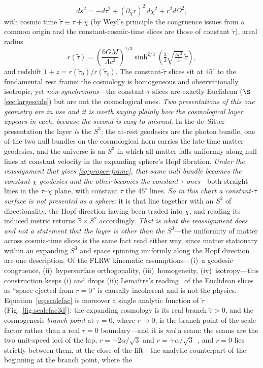 \documentclass[11pt,a4paper]{article}
\theoremstyle{plain}
\theoremstyle{definition}
\theoremstyle{remark}
\begin{document}
\begin{equation}
ds^2=-d\tau^2+(\partial_\chi r)^2\,d\chi^2+r^2 d\Omega^2,
\label{eq:proper-frame}
\end{equation}
with cosmic time $\tilde\tau\equiv\tau+\chi$ (by Weyl's principle the congruence issues from a common origin and the constant-cosmic-time slices are those of constant $\tilde\tau$), areal radius
\begin{equation}
r(\tilde\tau)=\left(\frac{6GM}{\Lambda c^2}\right)^{1/3}\sinh^{2/3}\!\left(\tfrac32\sqrt{\tfrac{\Lambda c^2}{3}}\,\tilde\tau\right),
\label{eq:scalefac}
\end{equation}
and redshift $1+z=r(\tilde\tau_0)/r(\tilde\tau_e)$. The constant-$\tilde\tau$ slices sit at $45^\circ$ to the fundamental rest frame: the cosmology is homogeneous and observationally isotropic, yet \emph{non-synchronous}---the constant-$\tau$ slices are exactly Euclidean ($\S$\ref{sec:largescale}) but are not the cosmological ones. \emph{Two presentations of this one geometry are in use and it is worth saying plainly how the cosmological layer appears in each, because the second is easy to misread.} In the de~Sitter presentation the layer \emph{is} the $S^3$: the at-rest geodesics are the photon bundle, one of the two null bundles on the cosmological horn carries the late-time matter geodesics, and the universe is an $S^3$ in which all matter falls uniformly along null lines at constant velocity in the expanding sphere's Hopf fibration. \emph{Under the reassignment that gives \eqref{eq:proper-frame}, that same null bundle becomes the constant-$\chi$ geodesics and the other becomes the constant-$\tau$ ones}---both straight lines in the $\tau$--$\chi$ plane, with constant $\tilde\tau$ the $45^\circ$ lines. \emph{So in this chart a constant-$\tilde\tau$ surface is not presented as a sphere}: it is that line together with an $S^2$ of directionality, the Hopf direction having been traded into $\chi$, and reading its induced metric returns $\mathbb{R}\times S^2$ accordingly. \emph{That is what the reassignment does and not a statement that the layer is other than the $S^3$}---the uniformity of matter across cosmic-time slices is the same fact read either way, since matter stationary within an expanding $S^3$ and space spinning uniformly along the Hopf direction are one description. Of the FLRW kinematic assumptions---(i)~a geodesic congruence, (ii)~hypersurface orthogonality, (iii)~homogeneity, (iv)~isotropy---this construction keeps (i) and drops (ii); Lemaître's reading~\cite{Lemaitre1949} of the Euclidean slices as ``space ejected from $r=0$'' is causally incoherent and is not the physics. Equation~\eqref{eq:scalefac} is moreover a single analytic function of $\tilde\tau$ (Fig.~\ref{fig:scalefac3d}): the expanding cosmology is its real branch $\tilde\tau>0$, and the cosmogenesis \emph{branch point} at $\tilde\tau=0$, where $r\to0$, is the branch point of the scale factor rather than a real $r=0$ boundary---and it is \emph{not} a seam: the seams are the two unit-speed loci of the lap, $r=-2\alpha/\sqrt3$ and $r=+\alpha/\sqrt3$~\cite{JanzenCRframework}, and $r=0$ lies strictly between them, at the close of the lift---the analytic counterpart of the beginning at the branch point, where the 
\end{document}
